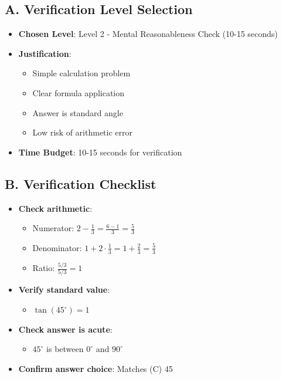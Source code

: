 \documentclass[12pt]{article}
\begin{document}
\begin{verificationbox}
\subsection*{A. Verification Level Selection}
\begin{itemize}[leftmargin=*]
    \item \textbf{Chosen Level}: Level 2 - Mental Reasonableness Check (10-15 seconds)
    \item \textbf{Justification}: 
    \begin{itemize}
        \item Simple calculation problem
        \item Clear formula application
        \item Answer is standard angle
        \item Low risk of arithmetic error
    \end{itemize}
    \item \textbf{Time Budget}: 10-15 seconds for verification
\end{itemize}

\subsection*{B. Verification Checklist}
\begin{itemize}[leftmargin=*]
    \item \textbf{Check arithmetic}:
    \begin{itemize}
        \item Numerator: $2 - \frac{1}{3} = \frac{6-1}{3} = \frac{5}{3}$ \checkmark
        \item Denominator: $1 + 2 \cdot \frac{1}{3} = 1 + \frac{2}{3} = \frac{5}{3}$ \checkmark
        \item Ratio: $\frac{5/3}{5/3} = 1$ \checkmark
    \end{itemize}
    \item \textbf{Verify standard value}:
    \begin{itemize}
        \item $\tan(45^\circ) = 1$ \checkmark
    \end{itemize}
    \item \textbf{Check answer is acute}:
    \begin{itemize}
        \item $45^\circ$ is between $0^\circ$ and $90^\circ$ \checkmark
    \end{itemize}
    \item \textbf{Confirm answer choice}: Matches (C) 45 \checkmark
\end{itemize}


\end{verificationbox}
\end{document}
